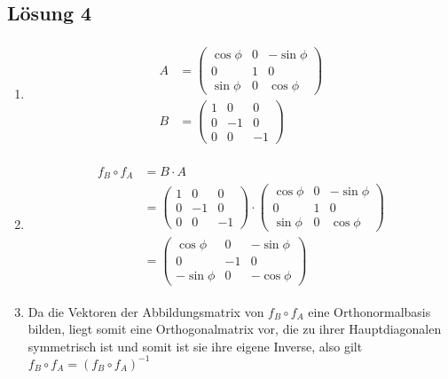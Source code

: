 \documentclass[main.tex]{subfiles}
\begin{document}
\subsection{Lösung 4}
\begin{enumerate}
\item 
\begin{align*}
    \begin{array}{rl}
        A & = \begin{pmatrix}
            \cos\phi & 0 & -\sin\phi\\
            0 & 1 & 0\\
            \sin\phi & 0 & \cos\phi				
        \end{pmatrix}\\[7mm]
        B & = \begin{pmatrix}
            1 & 0 & 0\\
            0 & -1 & 0\\
            0 & 0 & -1
        \end{pmatrix}
    \end{array}
\end{align*}

\item
\begin{align*}
    \begin{array}{rl}
        f_B \circ f_A & = B\cdot A\\ 
        & = \begin{pmatrix}
            1 & 0 & 0\\
            0 & -1 & 0\\
            0 & 0 & -1
        \end{pmatrix} \cdot
        \begin{pmatrix}
            \cos\phi & 0 & -\sin\phi\\
            0 & 1 & 0\\
            \sin\phi & 0 & \cos\phi				
        \end{pmatrix}\\[7mm]
        & = \begin{pmatrix}
            \cos\phi & 0 & -\sin\phi\\
            0 & -1 & 0\\
            -\sin\phi & 0 & -\cos\phi	
        \end{pmatrix}
    \end{array}
\end{align*}

\item
Da die Vektoren der Abbildungsmatrix von $f_B\circ f_A$ eine Orthonormalbasis bilden, liegt somit eine Orthogonalmatrix vor, die zu ihrer Hauptdiagonalen symmetrisch ist und somit ist sie ihre eigene Inverse, also gilt $f_B\circ f_A = (f_B\circ f_A)^{-1}$
\end{enumerate}
\end{document}
